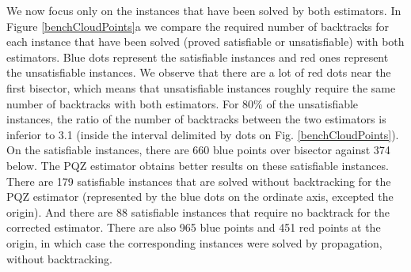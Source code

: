 \documentclass[jair,twoside,11pt,theapa]{article}
\begin{document}

We now focus only on the instances that have been solved by both estimators. In Figure \ref{benchCloudPoints}a we compare the required number of backtracks for each instance that have been solved (proved satisfiable or unsatisfiable) with both estimators. Blue dots represent the satisfiable instances and red ones represent the unsatisfiable instances. We observe that there are a lot of red dots near the first bisector, which means that unsatisfiable instances roughly require the same number of backtracks with both estimators. For 80\% of the unsatisfiable instances, the ratio of the number of backtracks between the two estimators is inferior to 3.1 (inside the interval delimited by dots on Fig. \ref{benchCloudPoints}). %
On the satisfiable instances, there are 660 blue points over bisector against 374 below. The PQZ estimator obtains better results on these satisfiable instances. 
There are 179 satisfiable instances that are solved without backtracking for the PQZ estimator (represented by the blue dots on the ordinate axis, excepted the origin). And there are 88 satisfiable instances that require no backtrack for the corrected estimator. There are also 965 blue points and 451 red points at the origin, in which case the corresponding instances were solved by propagation, without backtracking.

\end{document}
